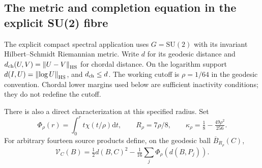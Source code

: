 \documentclass[11pt,oneside,openany]{book}
\theoremstyle{definition}
\theoremstyle{remark}
\newcommand{\dd}{\mathrm d}
\newcommand{\SU}{\mathrm{SU}}
\newcommand{\norm}[1]{\left\lVert#1\right\rVert}
\begin{document}
\subsection{The metric and completion equation in the explicit SU(2) fibre}
\label{sec:su2-pivot-equation}
The explicit compact spectral application uses $G=\SU(2)$ with its
invariant Hilbert--Schmidt Riemannian metric. Write $d$ for its geodesic
distance and $d_{\rm ch}(U,V)=\norm{U-V}_{\rm HS}$ for chordal distance.
On the logarithm support $d(I,U)=\norm{\log U}_{\rm HS}$, and
$d_{\rm ch}\le d$. The working cutoff is $\rho=1/64$ in the geodesic
convention. Chordal lower margins used below are sufficient inactivity
conditions; they do not redefine the cutoff.

There is also a direct characterization at this specified radius. Set
\[
 \Phi_\rho(r)=\int_0^r t\chi(t/\rho)\dd t,\qquad
 R_\rho=7\rho/8,\qquad
 \kappa_\rho=\tfrac18-\tfrac{49\rho^2}{256}.
\]
For arbitrary fourteen source products define, on the geodesic ball
$\overline B_{R_\rho}(C)$,
\[
 \mathcal V_C(B)=\tfrac12d(B,C)^2
             -\tfrac1{16}\sum_j\Phi_\rho(d(B,P_j)).
\]
\end{document}
